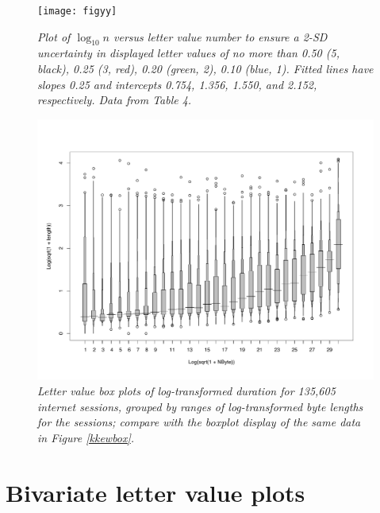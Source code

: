 \documentclass[11pt]{article}
\begin{document}
\begin{figure}[hbt]
\begin{center}
\texttt{[image: figyy]}
\caption{\it \label{figyy} Plot of $\log_10 n$ versus
letter value number to ensure a 2-SD uncertainty in
displayed letter values of no more than 0.50 (5, black),
0.25 (3, red), 0.20 (green, 2), 0.10 (blue, 1).  
Fitted lines have slopes 0.25 and intercepts 
0.754, 1.356, 1.550, and 2.152, respectively.
Data from Table 4.}
\end{center}
\end{figure}



\begin{figure}[hbt]
\begin{center}
\includegraphics[scale=.6,angle=270]{lvbox2}
\caption{\it \label{lvplot2} Letter value box plots of log-transformed
duration for 135,605 internet sessions, grouped by 
ranges of log-transformed byte lengths for the sessions; compare
with the boxplot display of the same data in Figure \ref{kkewbox}.}
\end{center}
\end{figure}

\vspace{-14mm}
\section{Bivariate letter value plots}
\end{document}
